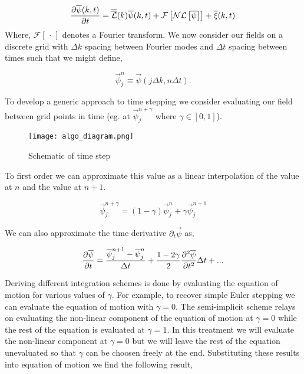 \begin{equation}
	\frac{\partial \overline{\psi}(k, t)}{\partial t} = \overline{\overline{\mathcal{L}}}(k)\overline{\psi}(k, t) + \mathcal{F}\left[\mathcal{NL}\left[\overline{\psi}\right]\right] + \overline{\xi}(k, t)
\end{equation}
Where, $\mathcal{F}[\,\cdot\,]$ denotes a Fourier transform. We now consider our fields on a discrete grid with $\Delta k$ spacing between Fourier modes and $\Delta t$ spacing between times such that we might define, 

\begin{equation}
	\vec{\psi}_j^n \equiv \vec{\psi}(j\Delta k, n\Delta t). 
\end{equation}

To develop a generic approach to time stepping we consider evaluating our field between grid points in time (eg. at $\vec{\psi}_j^{n + \gamma}$ where $\gamma \in [0, 1]$). 

\begin{figure}[H]
	\label{schem}
	\begin{center}
	\texttt{[image: algo\_diagram.png]}
	\end{center}
	\caption{Schematic of time step}
\end{figure}

To first order we can approximate this value as a linear interpolation of the value at $n$ and the value at $n + 1$. 

\begin{equation}
	\vec{\psi}_j^{n + \gamma} = (1 - \gamma) \vec{\psi}_j^n + \gamma \vec{\psi}_j^{n + 1}
\end{equation}

We can also approximate the time derivative $\partial_t \vec{\psi}$ as, 

\begin{equation}
	\frac{\partial \overline{\psi}}{\partial t} = \frac{\overline{\psi}_j^{n+1} - \overline{\psi}_j^n}{\Delta t} + \frac{1 - 2 \gamma}{2}\frac{\partial^2 \overline{\psi}}{\partial t^2} \Delta t + ...
\end{equation}

Deriving different integration schemes is done by evaluating the equation of motion for various values of $\gamma$. For example, to recover simple Euler stepping we can evaluate the equation of motion with $\gamma = 0$. The semi-implicit scheme relays on evaluating the non-linear component of the equation of motion at $\gamma = 0$ while the rest of the equation is evaluated at $\gamma = 1$. In this treatment we will evaluate the non-linear component at $\gamma = 0$ but we will leave the rest of the equation unevaluated so that $\gamma$ can be choosen freely at the end. Substituting these results into equation of motion we find the following result, 

